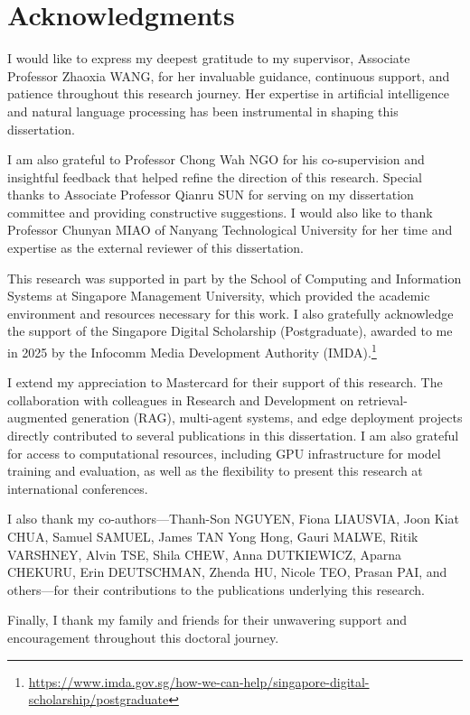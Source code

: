 \chapter*{Acknowledgments}

I would like to express my deepest gratitude to my supervisor, Associate Professor Zhaoxia WANG, for her invaluable guidance, continuous support, and patience throughout this research journey. Her expertise in artificial intelligence and natural language processing has been instrumental in shaping this dissertation.

I am also grateful to Professor Chong Wah NGO for his co-supervision and insightful feedback that helped refine the direction of this research. Special thanks to Associate Professor Qianru SUN for serving on my dissertation committee and providing constructive suggestions. I would also like to thank Professor Chunyan MIAO of Nanyang Technological University for her time and expertise as the external reviewer of this dissertation.

This research was supported in part by the School of Computing and Information Systems at Singapore Management University, which provided the academic environment and resources necessary for this work. I also gratefully acknowledge the support of the Singapore Digital Scholarship (Postgraduate), awarded to me in 2025 by the Infocomm Media Development Authority (IMDA).\footnote{\url{https://www.imda.gov.sg/how-we-can-help/singapore-digital-scholarship/postgraduate}}

I extend my appreciation to Mastercard for their support of this research. The collaboration with colleagues in Research and Development on retrieval-augmented generation (RAG), multi-agent systems, and edge deployment projects directly contributed to several publications in this dissertation. I am also grateful for access to computational resources, including GPU infrastructure for model training and evaluation, as well as the flexibility to present this research at international conferences.

I also thank my co-authors---Thanh-Son NGUYEN, Fiona LIAUSVIA, Joon Kiat CHUA, Samuel SAMUEL, James TAN Yong Hong, Gauri MALWE, Ritik VARSHNEY, Alvin TSE, Shila CHEW, Anna DUTKIEWICZ, Aparna CHEKURU, Erin DEUTSCHMAN, Zhenda HU, Nicole TEO, Prasan PAI, and others---for their contributions to the publications underlying this research.

Finally, I thank my family and friends for their unwavering support and encouragement throughout this doctoral journey.